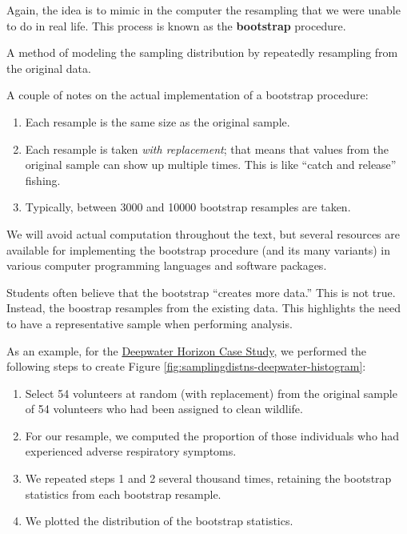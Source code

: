\documentclass[]{book}
\providecommand{\tightlist}{%
  \setlength{\itemsep}{0pt}\setlength{\parskip}{0pt}}
\theoremstyle{definition}
\theoremstyle{definition}
\theoremstyle{remark}
\let\BeginKnitrBlock\begin \let\EndKnitrBlock\end
\begin{document}
Again, the idea is to mimic in the computer the resampling that we were
unable to do in real life. This process is known as the
\textbf{bootstrap} procedure.

\BeginKnitrBlock{definition}[Bootstrap]
\protect\hypertarget{def:defn-bootstrap}{}{\label{def:defn-bootstrap}
{} }A method of modeling the sampling
distribution by repeatedly resampling from the original data.
\EndKnitrBlock{definition}

A couple of notes on the actual implementation of a bootstrap procedure:

\begin{enumerate}
\def\labelenumi{\arabic{enumi}.}
\tightlist
\item
  Each resample is the same size as the original sample.
\item
  Each resample is taken \emph{with replacement}; that means that values
  from the original sample can show up multiple times. This is like
  ``catch and release'' fishing.
\item
  Typically, between 3000 and 10000 bootstrap resamples are taken.
\end{enumerate}

We will avoid actual computation throughout the text, but several
resources are available for implementing the bootstrap procedure (and
its many variants) in various computer programming languages and
software packages.

\BeginKnitrBlock{rmdtip}
Students often believe that the bootstrap ``creates more data.'' This is
not true. Instead, the boostrap resamples from the existing data. This
highlights the need to have a representative sample when performing
analysis.
\EndKnitrBlock{rmdtip}

As an example, for the \protect\hyperlink{CaseDeepwater}{Deepwater
Horizon Case Study}, we performed the following steps to create Figure
\ref{fig:samplingdistns-deepwater-histogram}:

\begin{enumerate}
\def\labelenumi{\arabic{enumi}.}
\tightlist
\item
  Select 54 volunteers at random (with replacement) from the original
  sample of 54 volunteers who had been assigned to clean wildlife.
\item
  For our resample, we computed the proportion of those individuals who
  had experienced adverse respiratory symptoms.
\item
  We repeated steps 1 and 2 several thousand times, retaining the
  bootstrap statistics from each bootstrap resample.
\item
  We plotted the distribution of the bootstrap statistics.
\end{enumerate}
\end{document}
